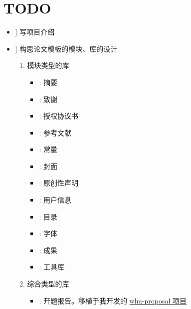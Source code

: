 

\chapter{TODO}

\newcommand\Done{\faCheckSquare[regular]} %
\newcommand\HalfDone{\faMinusSquare[regular]} %
\newcommand\NotDone{\faSquare[regular]} %
\newcommand\ToBeSpecified{\faPlusSquare[regular]} %

\goodbreak
\begin{itemize}[midpenalty=-1000,
  label=\protect\raisebox{-.3ex}{\NotDone}]
  \item[\Done] 写项目介绍
  \item[\ToBeSpecified] 构思论文模板的模块、库的设计
    \begin{enumerate}
      \item 模块类型的库
        \begin{itemize}[midpenalty=-1000,
          label=\protect\raisebox{-.3ex}{\NotDone}]
          \item {}: 摘要
          \item {}: 致谢
          \item {}: 授权协议书
          \item {}: 参考文献
          \item {}: 常量
          \item {}: 封面
          \item {}: 原创性声明
          \item {}: 用户信息
          \item {}: 目录
          \item {}: 字体
          \item {}: 成果
          \item {}: 工具库
        \end{itemize}
      \item 综合类型的库
        \begin{itemize}[midpenalty=-1000,
          label=\protect\raisebox{-.3ex}{\NotDone}]
          \item {}: 开题报告。移植于我开发的 \href{https://github.com/whutug/whu-proposal}{whu-proposal 项目}

\end{itemize}
\end{enumerate}
\end{itemize}
